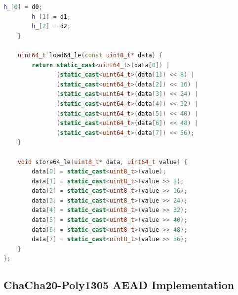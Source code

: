 \documentclass[11pt,a4paper]{article}
\begin{document}
\begin{lstlisting}[language=C++, caption=Poly1305 Implementation]
        h_[0] = d0;
        h_[1] = d1;
        h_[2] = d2;
    }
    
    uint64_t load64_le(const uint8_t* data) {
        return static_cast<uint64_t>(data[0]) |
               (static_cast<uint64_t>(data[1]) << 8) |
               (static_cast<uint64_t>(data[2]) << 16) |
               (static_cast<uint64_t>(data[3]) << 24) |
               (static_cast<uint64_t>(data[4]) << 32) |
               (static_cast<uint64_t>(data[5]) << 40) |
               (static_cast<uint64_t>(data[6]) << 48) |
               (static_cast<uint64_t>(data[7]) << 56);
    }
    
    void store64_le(uint8_t* data, uint64_t value) {
        data[0] = static_cast<uint8_t>(value);
        data[1] = static_cast<uint8_t>(value >> 8);
        data[2] = static_cast<uint8_t>(value >> 16);
        data[3] = static_cast<uint8_t>(value >> 24);
        data[4] = static_cast<uint8_t>(value >> 32);
        data[5] = static_cast<uint8_t>(value >> 40);
        data[6] = static_cast<uint8_t>(value >> 48);
        data[7] = static_cast<uint8_t>(value >> 56);
    }
};
\end{lstlisting}

\subsection{ChaCha20-Poly1305 AEAD Implementation}
\end{document}
